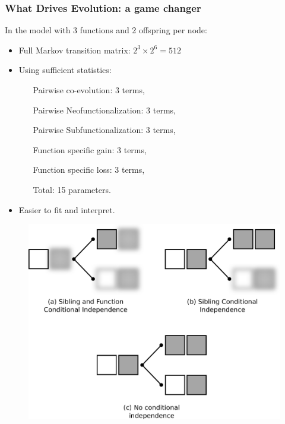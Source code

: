 \documentclass[aspectratio=169, 9pt, handout]{beamer}
\begin{document}
\begin{frame}[c]
	\frametitle{What Drives Evolution: a game changer}
	
	\begin{minipage}[m]{.59\linewidth}
		In the model with 3 functions and 2 offspring per node:\pause
		\begin{itemize}
			\item Full Markov transition matrix: $2^3 \times 2^6 = 512$\pause
			\item Using sufficient statistics:\pause
			\begin{itemize}
				\item[] Pairwise co-evolution: 3 terms,\pause
				\item[]	Pairwise Neofunctionalization: 3 terms,\pause
				\item[] Pairwise Subfunctionalization: 3 terms,\pause
				\item[] Function specific gain: 3 terms,\pause
				\item[] Function specific loss: 3 terms,\pause
				\item[Total:] 15 parameters. \pause
			\end{itemize}
			\item Easier to fit and interpret.
		\end{itemize}
	\end{minipage}\hfill
	\begin{minipage}[m]{.39\linewidth}
		\begin{figure}
			\centering
			\includegraphics[width=.99\linewidth]{phylo-model-overview.pdf}
		\end{figure}
	\end{minipage}
	
\end{frame}
\end{document}
